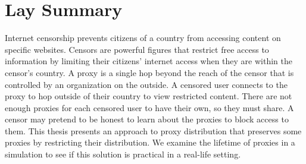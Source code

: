

\chapter{Lay Summary}
Internet censorship prevents citizens of a country from accessing content on specific websites. Censors are powerful figures that restrict free access to information by limiting their citizens' internet access when they are within the censor's country. A proxy is a single hop beyond the reach of the censor that is controlled by an organization on the outside. A censored user connects to the proxy to hop outside of their country to view restricted content. There are not enough proxies for each censored user to have their own, so they must share. A censor may pretend to be honest to learn about the proxies to block access to them. This thesis presents an approach to proxy distribution that preserves some proxies by restricting their distribution. We examine the lifetime of proxies in a simulation to see if this solution is practical in a real-life setting. 